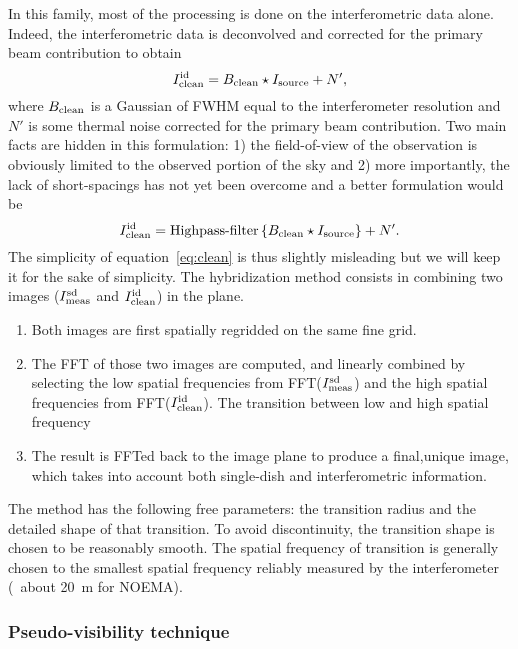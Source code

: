 In this family, most of the processing is done on the interferometric data
alone. Indeed, the interferometric data is deconvolved and corrected for
the primary beam contribution to obtain
\begin{equation}
  I_{\mathrm{clean}}^{\mathrm{id}} = B_{\mathrm{clean}} \star I_{\mathrm{source}} + N',
  \label{eq:clean}
\end{equation}
where $B_{\mathrm{clean}}$ is a Gaussian of FWHM equal to the interferometer
resolution and $N'$ is some thermal noise corrected for the primary beam
contribution.  Two main facts are hidden in this formulation: 1) the
field-of-view of the observation is obviously limited to the observed
portion of the sky and 2) more importantly, the lack of short-spacings has
not yet been overcome and a better formulation would be
\begin{equation}
  I_{\mathrm{clean}}^{\mathrm{id}} = \mbox{Highpass-filter}\displaystyle\left\{ B_{\mathrm{clean}} \star I_{\mathrm{source}} \right\} + N'.
\end{equation}
The simplicity of equation~\ref{eq:clean} is thus slightly misleading but
we will keep it for the sake of simplicity. The hybridization method
consists in combining two images ($I_{\mathrm{meas}}^{\mathrm{sd}}$ and
$I_{\mathrm{clean}}^{\mathrm{id}}$) in the \uv{} plane.

\begin{enumerate}
\item Both images are first spatially regridded on the same fine grid.
\item The FFT of those two images are computed, and linearly combined by
  selecting the low spatial frequencies from FFT($I_{\mathrm{meas}}^{\mathrm{sd}}$)
  and the high spatial frequencies from FFT($I_{\mathrm{clean}}^{\mathrm{id}}$).
  The transition between low and high spatial frequency
\item The result is FFTed back to the image plane to produce a final,unique
  image, which takes into account both single-dish and interferometric
  information.
\end{enumerate}
The method has the following free parameters: the transition radius and the
detailed shape of that transition.  To avoid discontinuity, the transition
shape is chosen to be reasonably smooth. The spatial frequency of
transition is generally chosen to the smallest spatial frequency reliably
measured by the interferometer (\eg\ about 20~m for NOEMA).

\subsubsection{Pseudo-visibility technique}

